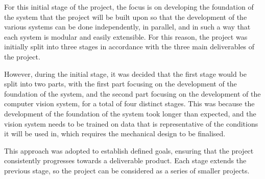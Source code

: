 \noindent
For this initial stage of the project, the focus is on developing the foundation of the system that the project
will be built upon so that the development of the various systems can be done independently, in parallel, and in such a way that each system
is modular and easily extensible. For this reason, the project was initially split into three stages in accordance
with the three main deliverables of the project. 

However, during the initial stage, it was decided that the first stage would be split into two parts, with the first part focusing on the development of the foundation of the system, 
and the second part focusing on the development of the computer vision system, for a total of four distinct stages. This was because the development of the foundation of the
system took longer than expected, and the vision system needs to be trained on data that is representative of the conditions it will be used in, which requires the mechanical design to be finalised.

This approach was adopted to establish defined goals, ensuring that the project consistently progresses towards a deliverable product. 
Each stage extends the previous stage, so the project can be considered as a series of smaller projects. 
